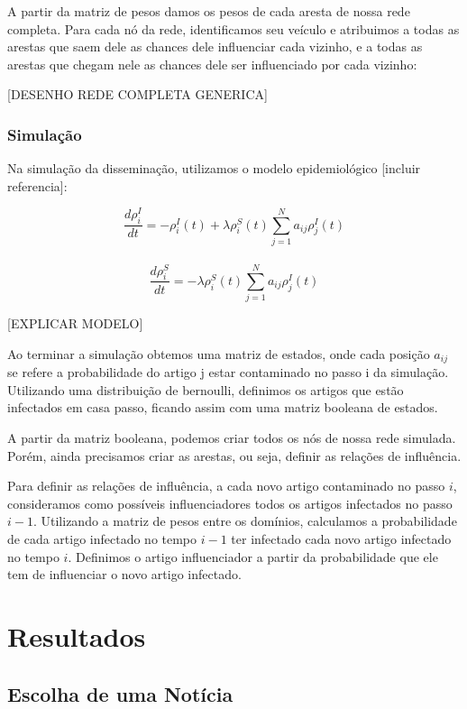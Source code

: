 \documentclass[a4paper,12pt]{article}
\begin{document}
A partir da matriz de pesos damos os pesos de cada aresta de nossa rede completa. Para cada nó da rede, identificamos seu veículo e atribuimos
a todas as arestas que saem dele as chances dele influenciar cada vizinho, e a todas as arestas que chegam nele as chances dele ser influenciado
por cada vizinho:

[DESENHO REDE COMPLETA GENERICA]

\subsubsection{Simulação}

 Na simulação da disseminação, utilizamos o modelo epidemiológico [incluir referencia]:

   $$\dfrac{d\rho^{I}_{i}}{dt} = -\rho^{I}_{i}(t) + \lambda\rho_{i}^{S}(t) \sum_{j=1}^{N} a_{ij}\rho_{j}^{I}(t)$$\\
   $$\dfrac{d\rho^{S}_{i}}{dt} = - \lambda\rho_{i}^{S}(t) \sum_{j=1}^{N} a_{ij}\rho_{j}^{I}(t)$$

   [EXPLICAR MODELO]
  
  Ao terminar a simulação obtemos uma matriz de estados, onde cada posição $a_{ij}$ se refere a probabilidade do artigo
  j estar contaminado no passo i da simulação. Utilizando uma distribuição de bernoulli, definimos os artigos que estão infectados
  em casa passo, ficando assim com uma matriz booleana de estados.
  
  A partir da matriz booleana, podemos criar todos os nós de nossa rede simulada. Porém, ainda precisamos criar as arestas, ou seja, definir
  as relações de influência. 
  
  Para definir as relações de influência, a cada novo artigo contaminado no passo $i$, consideramos como possíveis influenciadores todos os artigos
  infectados no passo $i-1$. Utilizando a matriz de pesos entre os domínios, calculamos a probabilidade de cada artigo infectado no tempo
  $i-1$ ter infectado cada novo artigo infectado no tempo $i$. Definimos o artigo influenciador a partir da probabilidade que ele tem de 
  influenciar o novo artigo infectado. 

\section{Resultados}
 

\subsection{Escolha de uma Notícia}
\end{document}
